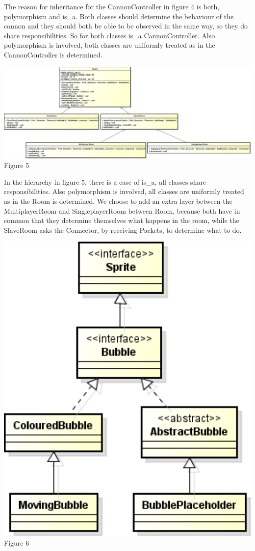 \documentclass[a4paper]{article}
\begin{document}
The reason for inheritance for the CannonController in figure 4 is both, polymorphism and is\_a. Both classes should determine the behaviour of the cannon and they should both be able to be observed in the same way, so they do share responsibilities. So for both classes is\_a CannonController. Also polymorphism is involved, both classes are uniformly treated as in the CannonController is determined.

\includegraphics[width=1\textwidth]{RoomInher.png}
Figure 5

In the hierarchy in figure 5, there is a case of is\_a, all classes share responsibilities. Also polymorphism is involved, all classes are uniformly treated as in the Room is determined. We choose to add an extra layer between the MultiplayerRoom and SingleplayerRoom between Room, because both have in common that they determine themselves what happens in the room, while the SlaveRoom asks the Connector, by receiving Packets, to determine what to do.

\includegraphics[width=1\textwidth]{bubbleInher.png}
Figure 6
\end{document}
